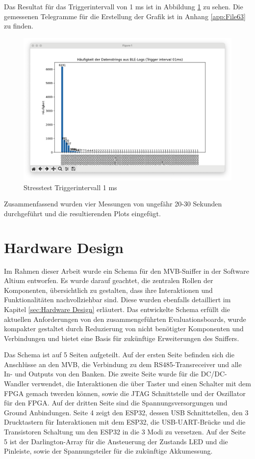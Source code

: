 \newpage

Das Resultat für das Triggerintervall von 1 ms ist in Abbildung \ref{fig:Stress01} zu sehen. Die gemessenen Telegramme für die Erstellung der Grafik ist in Anhang \ref{app:File63} zu finden.

\begin{figure}[H]
    \centering
    \includegraphics[width=0.9\linewidth]{Figures/Chap4/Stesstest/Stress_01.png}
    \caption{Stresstest Triggerintervall 1 ms}
    \label{fig:Stress01}
\end{figure}

Zusammenfassend wurden vier Messungen von ungefähr 20-30 Sekunden durchgeführt und die resultierenden Plots eingefügt.

\section{Hardware Design}
\label{sec:ResultatHardware}
Im Rahmen dieser Arbeit wurde ein Schema für den MVB-Sniffer in der Software Altium entworfen. Es wurde darauf geachtet, die zentralen Rollen der Komponenten, übersichtlich zu gestalten, dass ihre Interaktionen und Funktionalitäten nachvollziehbar sind. Diese wurden ebenfalls detailliert im Kapitel \ref{sec:Hardware Design} erläutert. Das entwickelte Schema erfüllt die aktuellen Anforderungen von den zusammengeführten Evaluationsboards, wurde kompakter gestaltet durch Reduzierung von nicht benötigter Komponenten und Verbindungen und bietet eine Basis für zukünftige Erweiterungen des Sniffers. 

Das Schema ist auf 5 Seiten aufgeteilt. Auf der ersten Seite befinden sich die Anschlüsse an den MVB, die Verbindung zu dem RS485-Transreceiver und alle In- und Outputs von den Banken. Die zweite Seite wurde für die DC/DC-Wandler verwendet, die Interaktionen die über Taster und einen Schalter mit dem FPGA gemach twerden können, sowie die JTAG Schnittstelle und der Oszillator für den FPGA. Auf der dritten Seite sind die Spannungsversorgungen und Ground Anbindungen. Seite 4 zeigt den ESP32, dessen USB Schnittstellen, den 3 Drucktastern für Interaktionen mit dem ESP32, die USB-UART-Brücke und die Transistoren Schaltung um den ESP32 in die 3 Modi zu versetzen. Auf der Seite 5 ist der Darlington-Array für die Ansteuerung der Zustands LED und die Pinleiste, sowie der Spannungsteiler für die zukünftige Akkumessung. 

